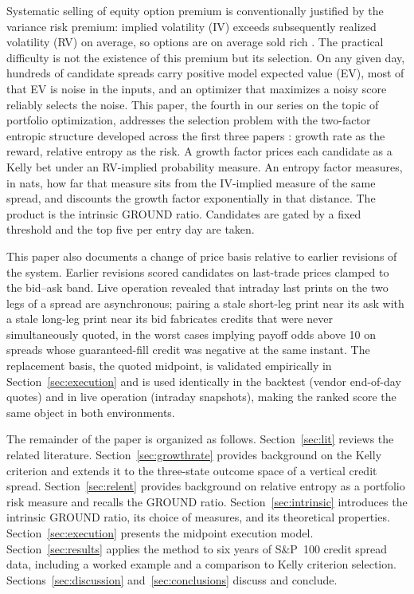 \documentclass[11pt]{article}
\begin{document}
Systematic selling of equity option premium is conventionally justified by the
variance risk premium: implied volatility (IV) exceeds subsequently realized
volatility (RV) on average, so options are on average sold rich
\cite{carrwu2009, bollerslev2009, bakshikapadia2003}. The practical
difficulty is not the existence of this premium but its selection. On any
given day, hundreds of candidate spreads carry positive model expected value
(EV), most of that EV is noise in the inputs, and an optimizer that maximizes
a noisy score reliably selects the noise. This paper, the fourth in our series
on the topic of portfolio optimization, addresses the selection problem with
the two-factor entropic structure developed across the first three papers
\cite{mercurio2020repo, mercurio2020binary, mercurio2020gepo}: growth rate as
the reward, relative entropy as the risk. A growth factor prices each
candidate as a Kelly bet \cite{kelly1956} under an RV-implied probability
measure. An entropy factor measures, in nats, how far that measure sits from
the IV-implied measure of the same spread, and discounts the growth factor
exponentially in that distance. The product is the intrinsic GROUND ratio.
Candidates are gated by a fixed threshold and the top five per entry day are
taken.

This paper also documents a change of price basis relative to earlier
revisions of the system. Earlier revisions scored candidates on last-trade
prices clamped to the bid--ask band. Live operation revealed that intraday
last prints on the two legs of a spread are asynchronous; pairing a stale
short-leg print near its ask with a stale long-leg print near its bid
fabricates credits that were never simultaneously quoted, in the worst cases
implying payoff odds above 10 on spreads whose guaranteed-fill credit was
negative at the same instant. The replacement basis, the quoted midpoint, is
validated empirically in Section~\ref{sec:execution} and is used identically
in the backtest (vendor end-of-day quotes) and in live operation (intraday
snapshots), making the ranked score the same object in both environments.

The remainder of the paper is organized as follows. Section~\ref{sec:lit}
reviews the related literature. Section~\ref{sec:growthrate} provides
background on the Kelly criterion and extends it to the three-state outcome
space of a vertical credit spread. Section~\ref{sec:relent} provides
background on relative entropy as a portfolio risk measure and recalls the
GROUND ratio. Section~\ref{sec:intrinsic} introduces the intrinsic GROUND
ratio, its choice of measures, and its theoretical properties. Section~\ref{sec:execution} presents the
midpoint execution model. Section~\ref{sec:results} applies the method to six
years of S\&P~100 credit spread data, including a worked example and a
comparison to Kelly criterion selection. Sections~\ref{sec:discussion}
and~\ref{sec:conclusions} discuss and conclude.
\end{document}
